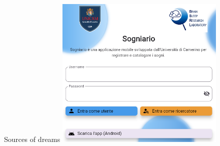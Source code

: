 \documentclass[xcolor=x11names,compress]{beamer}
\begin{document}
{
    \begin{frame}[t]{Sources of dreams}
        \centering
            \includegraphics[width=0.6\textwidth]{immagini/sogniario}
    \end{frame}}
\end{document}
